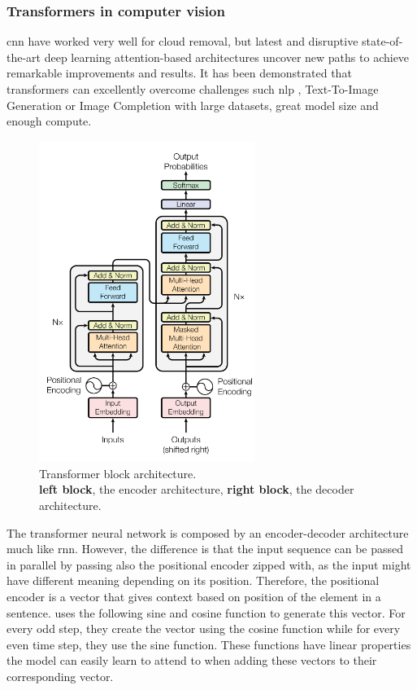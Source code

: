 \documentclass[../main.tex]{subfiles}
\begin{document}
\subsubsection{Transformers in computer vision}
\gls{cnn} have worked very well for cloud removal, but latest and disruptive state-of-the-art deep learning attention-based architectures \cite{VaswaniSPUJGKP17} uncover new paths to achieve remarkable improvements and results. It has been demonstrated that transformers can excellently overcome challenges such \gls{nlp} \cite{brown2020language}, Text-To-Image Generation \cite{pmlr-v139-ramesh21a}  or Image Completion \cite{pmlr-v119-chen20s} with large datasets, great model size and enough compute.
\begin{figure}[H]
	\centering
	\includegraphics[width=7cm]{imgs/relatedwork/transformer-block}
	\caption{Transformer block architecture. \\
		\textbf{left block}, the encoder architecture, \textbf{right block}, the decoder architecture.}
	\label{fig:related-transformer-block}
\end{figure}
The transformer neural network is composed by an encoder-decoder architecture  much like \gls{rnn}. However, the difference is that the input sequence can be passed in parallel by passing also the positional encoder zipped with, as the input might have different meaning depending on its position. Therefore, the positional encoder is a vector that gives context based on position of the element in a sentence. \cite{VaswaniSPUJGKP17} uses the following sine and cosine function to generate this vector. For every odd step, they create the vector using the cosine function while for every even time step, they use the sine function. These functions have linear properties the model can easily learn to attend to when adding these vectors to their corresponding vector.
\end{document}
